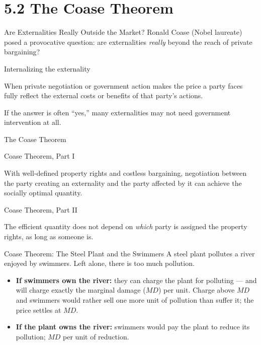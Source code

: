 \documentclass[11pt,aspectratio=169]{beamer}
\begin{document}
\section{5.2 The Coase Theorem}

\begin{frame}{Are Externalities Really Outside the Market?}
  Ronald Coase (Nobel laureate) posed a provocative question: are externalities \emph{really} beyond the reach of private bargaining?
  \begin{block}{Internalizing the externality}
    \end{block}
    When private negotiation or government action makes the price a party faces fully reflect the external costs or benefits of that party's actions.

  If the answer is often ``yes,'' many externalities may not need government intervention at all.
\end{frame}

\begin{frame}{The Coase Theorem}
	  \begin{block}
 {Coase Theorem, Part I}
  \end{block}
    With well-defined property rights and costless bargaining, negotiation between the party creating an externality and the party affected by it can achieve the socially optimal quantity.


  \begin{block}{Coase Theorem, Part II}
  	  \end{block}
    The efficient quantity does not depend on \emph{which} party is assigned the property rights, as long as someone is.

\end{frame}

\begin{frame}{Coase Theorem: The Steel Plant and the Swimmers}
  A steel plant pollutes a river enjoyed by swimmers. Left alone, there is too much pollution.
  \begin{itemize}
    \item \textbf{If swimmers own the river:} they can charge the plant for polluting --- and will charge exactly the marginal damage (\(MD\)) per unit. Charge above \(MD\) and swimmers would rather sell one more unit of pollution than suffer it; the price settles at \(MD\).
    \item \textbf{If the plant owns the river:}  swimmers would pay the plant to reduce its pollution;  \(MD\) per unit of reduction.
  \end{itemize}


\end{frame}
\end{document}
